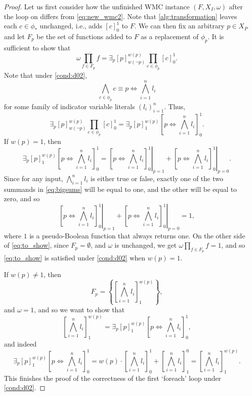 \documentclass[runningheads]{llncs}
\begin{document}
\begin{proof}
  Let us first consider how the unfinished WMC instance $(F, X_I, \omega)$ after
  the loop on  differs from
  \eqref{eq:new_wmc2}. Note that \cref{alg:transformation} leaves each $c \in
  \phi_*$ unchanged, i.e., adds $[c]_0^1$ to $F$. We can then fix an arbitrary
  $p \in X_P$ and let $F_p$ be the set of functions added to $F$ as a
  replacement of $\phi_p$. It is sufficient to show that
  \begin{equation} \label{eq:to_show}
    \omega \prod_{f \in F_p} f = \exists_p [p]_{w(\neg p)}^{w(p)} \prod_{c \in \phi_p} [c]_0^1.
  \end{equation}
  Note that under \cref{cond:d02},
  \[
    \bigwedge_{c \in \phi_p} c \equiv p \Leftrightarrow \bigwedge_{i=1}^n l_i
  \]
  for some family of indicator variable literals $(l_i)_{i=1}^n$. Thus,
  \[
    \exists_p [p]_{w(\neg p)}^{w(p)} \prod_{c \in \phi_p} [c]_0^1 = \exists_p
    [p]_1^{w(p)} \left[ p \Leftrightarrow \bigwedge_{i=1}^n l_i \right]_0^1.
  \]
  If $w(p) = 1$, then
  \begin{equation} \label{eq:bigsums}
    \exists_p [p]_1^{w(p)} \left[ p \Leftrightarrow \bigwedge_{i=1}^n l_i \right]_0^1 = \left.\left[ p \Leftrightarrow \bigwedge_{i=1}^n l_i \right]_0^1\right|_{p=1} + \left.\left[ p \Leftrightarrow \bigwedge_{i=1}^n l_i \right]_0^1\right|_{p=0}.
  \end{equation}
  Since for any input, $\bigwedge_{i=1}^n l_i$ is either true or false, exactly
  one of the two summands in \cref{eq:bigsums} will be equal to one, and the
  other will be equal to zero, and so
  \[
    \left.\left[ p \Leftrightarrow \bigwedge_{i=1}^n l_i
      \right]_0^1\right|_{p=1} + \left.\left[ p \Leftrightarrow \bigwedge_{i=1}^n
        l_i \right]_0^1\right|_{p=0} = 1,
  \]
  where $1$ is a pseudo-Boolean function that always returns one. On the other
  side of \cref{eq:to_show}, since $F_p = \emptyset$, and $\omega$ is unchanged,
  we get $\omega\prod_{f \in F_p} f = 1$, and so \cref{eq:to_show} is satisfied
  under \cref{cond:d02} when $w(p) = 1$.

  If $w(p) \ne 1$, then
  \[
    F_p = \left\{ \left[ \bigwedge_{i = 1}^n l_i \right]_1^{w(p)} \right\},
  \]
  and $\omega = 1$, and so we want to show that
  \[
    \left[ \bigwedge_{i = 1}^n l_i \right]_1^{w(p)} = \exists_p [p]_1^{w(p)}
    \left[ p \Leftrightarrow \bigwedge_{i=1}^n l_i \right]_0^1,
  \]
  and indeed
  \[
    \exists_p [p]_1^{w(p)} \left[ p \Leftrightarrow \bigwedge_{i=1}^n l_i
    \right]_0^1 = w(p) \cdot \left[ \bigwedge_{i=1}^n l_i \right]_0^1 + \left[
      \bigwedge_{i=1}^n l_i \right]_1^0 = \left[ \bigwedge_{i=1}^n l_i
    \right]_1^{w(p)}.
  \]
  This finishes the proof of the correctness of the first `foreach' loop under
  \cref{cond:d02}.


\end{proof}
\end{document}
